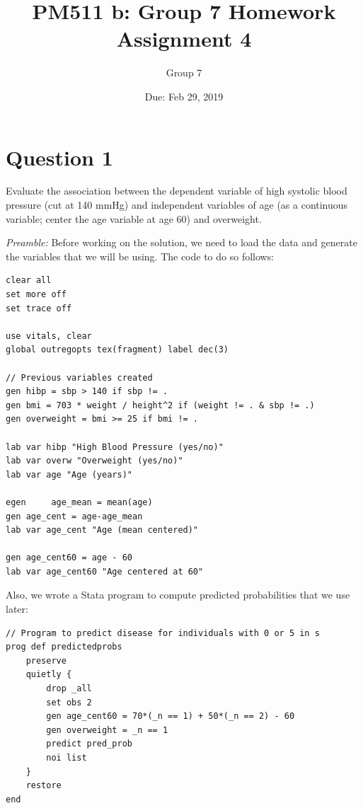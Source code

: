 \documentclass{article}
\title{PM511 b: Group 7 Homework Assignment 4}
\author{Group 7}
\date{Due: Feb 29, 2019}
\begin{document}
\selectfont

\maketitle

\section{Question 1}
 Evaluate the association between the dependent variable of high systolic blood pressure (cut at 140 mmHg) and independent variables of age (as a continuous variable; center the age variable at age 60) and overweight.
 
 \textit{Preamble:} Before working on the solution, we need to load the data and generate the variables that we will be using. The code to do so follows:
 
 \begin{verbatim}
clear all
set more off
set trace off

use vitals, clear
global outregopts tex(fragment) label dec(3)

// Previous variables created
gen hibp = sbp > 140 if sbp != .
gen bmi = 703 * weight / height^2 if (weight != . & sbp != .)
gen overweight = bmi >= 25 if bmi != .

lab var hibp "High Blood Pressure (yes/no)"
lab var overw "Overweight (yes/no)"
lab var age "Age (years)"

egen     age_mean = mean(age)
gen age_cent = age-age_mean
lab var age_cent "Age (mean centered)"

gen age_cent60 = age - 60
lab var age_cent60 "Age centered at 60"
\end{verbatim}

Also, we wrote a Stata program to compute predicted probabilities that we use later:

\begin{verbatim}
// Program to predict disease for individuals with 0 or 5 in s
prog def predictedprobs
    preserve
    quietly {
        drop _all
        set obs 2
        gen age_cent60 = 70*(_n == 1) + 50*(_n == 2) - 60
        gen overweight = _n == 1
        predict pred_prob
        noi list
    }
    restore
end
\end{verbatim}
 
\end{document}
